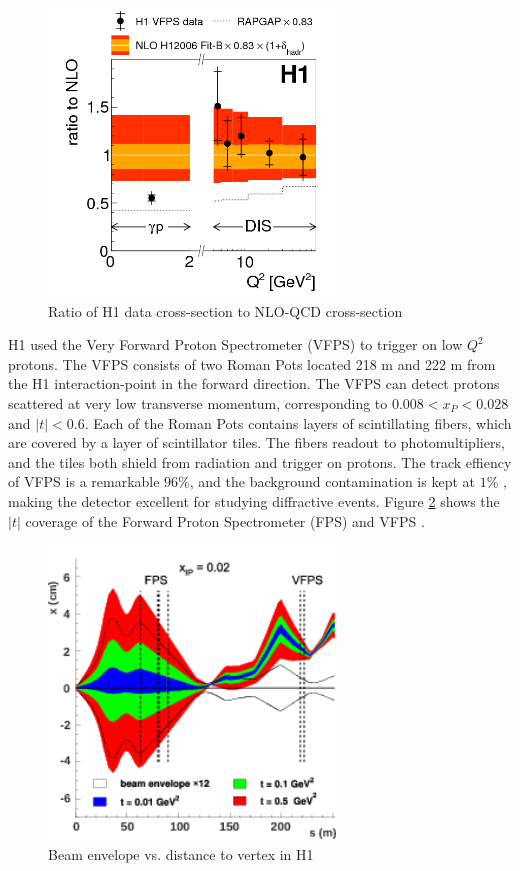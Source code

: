 \begin{figure}[h!]
\begin{centering}
\includegraphics[width=3in]{Chapter1/importfigs/fig8_h1_2015.png}
\par\end{centering}
\caption{Ratio of H1 data cross-section to NLO-QCD cross-section \cite{Andreev:2015cwa} \label{fig:h1Ratio}}
\end{figure}

H1 used the Very Forward Proton Spectrometer (VFPS) to trigger on low $Q^2$ protons. The VFPS consists of two Roman Pots located 218 m and 222 m from the H1 interaction-point in the forward direction. The VFPS can detect protons scattered at very low transverse momentum, corresponding to $0.008 < x_{P} < 0.028$ and $|t|<0.6$. Each of the Roman Pots contains layers of scintillating fibers, which are covered by a layer of scintillator tiles. The fibers readout to photomultipliers, and the tiles both shield from radiation and trigger on protons. The track effiency of VFPS is a remarkable $96 \%$, and the background contamination is kept at $1 \%$ , making the detector excellent for studying diffractive events. Figure \ref{fig:h1BeamEnv} shows the $|t|$ coverage of the Forward Proton Spectrometer (FPS) and VFPS \cite{Andreev:2015cwa}.

\begin{figure}[h!]
\begin{centering}
\includegraphics[width=3in]{Chapter1/importfigs/fig7_h1_2015.png}
\par\end{centering}
\caption{Beam envelope vs. distance to vertex in H1 \cite{Andreev:2015cwa} \label{fig:h1BeamEnv}}
\end{figure}

